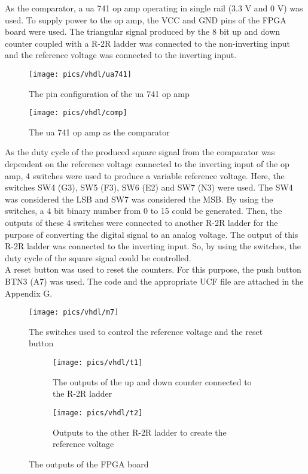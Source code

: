 \noindent
As the comparator, a ua 741 op amp operating in single rail (3.3 V and 0 V)  was used. To supply power to the op amp, the VCC  and GND pins of the FPGA board were used. The triangular  signal produced by the 8 bit up and down counter coupled with a R-2R ladder was connected to the non-inverting input and the reference voltage was connected to the inverting input. \\

\begin{figure}[!h]
	\centering
	\texttt{[image: pics/vhdl/ua741]}
	\caption{The pin configuration of the ua 741 op amp}
	\label{fig:ua741}
\end{figure}

\begin{figure}[!h]
	\centering
	\texttt{[image: pics/vhdl/comp]}
	\caption{The ua 741 op amp as the comparator}
	\label{fig:comp}
\end{figure}



\noindent
As the duty cycle of the produced square signal from the comparator was dependent on the reference voltage connected to the inverting input of the op amp, 4 switches were used to produce a variable reference voltage. Here, the switches SW4 (G3), SW5 (F3), SW6 (E2) and SW7 (N3) were used. The SW4 was considered the LSB and SW7 was considered the MSB. By using the switches, a 4 bit binary number from 0 to 15 could be generated. Then, the outputs of these 4 switches were connected to another R-2R ladder for the purpose of converting the digital signal to an analog voltage. The output of this R-2R ladder was connected to the inverting input. So, by using the switches, the duty cycle of the square signal could be controlled.\\

\noindent
A reset button was used to reset the counters. For this purpose,  the push button BTN3 (A7) was used. The  code and the appropriate UCF file are attached in the Appendix G.


\begin{figure}[!h]
	\centering
	\texttt{[image: pics/vhdl/m7]}
	\caption{The switches used to control the reference voltage and the reset button}
	\label{fig:m7}
\end{figure}

\begin{figure}[!h]
	\centering
	\begin{subfigure}{.5\textwidth}
		\centering
		\texttt{[image: pics/vhdl/t1]}
		\caption{The outputs of the up and down \newline counter connected to the R-2R ladder}
		\label{fig:t1}
	\end{subfigure}%
	\begin{subfigure}{.5\textwidth}
		\centering
		\texttt{[image: pics/vhdl/t2]}
		\caption{Outputs to the other R-2R ladder to create the reference voltage}
		\label{fig:sub2}
	\end{subfigure}
	\caption{The outputs of the FPGA board}
	\label{fig:t2}
\end{figure}

